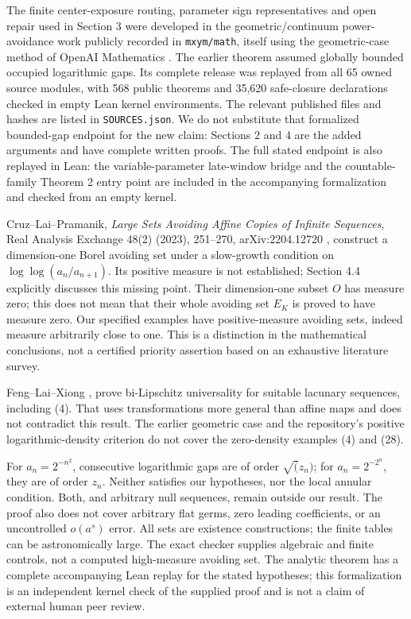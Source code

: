 \documentclass[
  11pt,
]{article}
\begin{document}
The finite center-exposure routing, parameter sign representatives and
open repair used in Section 3 were developed in the geometric/continuum
power-avoidance work publicly recorded in \texttt{mxym/math}, itself
using the geometric-case method of OpenAI Mathematics \cite{GEO}. The earlier
theorem \cite{ZCONT} assumed globally bounded occupied logarithmic gaps. Its complete
release was replayed from all 65 owned source modules, with 568 public
theorems and 35,620 safe-closure declarations checked in empty Lean
kernel environments. The relevant published files and hashes are listed
in \texttt{SOURCES.json}. We do not substitute that formalized
bounded-gap endpoint for the new claim: Sections 2 and 4 are the added
arguments and have complete written proofs. The full stated endpoint is
also replayed in Lean: the variable-parameter late-window bridge and the
countable-family Theorem 2 entry point are included in the accompanying
formalization and checked from an empty kernel.

Cruz--Lai--Pramanik, \emph{Large Sets Avoiding Affine Copies of Infinite
Sequences}, Real Analysis Exchange 48(2) (2023), 251--270,
arXiv:2204.12720 \cite{CLP}, construct a dimension-one Borel avoiding set under a
slow-growth condition on \(\log\log (a_n/a_{n+1})\). Its positive
measure is not established; Section 4.4 explicitly discusses this
missing point. Their dimension-one subset \(O\) has measure zero; this
does not mean that their whole avoiding set \(E_K\) is proved to have
measure zero. Our specified examples have positive-measure avoiding
sets, indeed measure arbitrarily close to one. This is a distinction in
the mathematical conclusions, not a certified priority assertion based
on an exhaustive literature survey.

Feng--Lai--Xiong \cite{FLX}, prove bi-Lipschitz universality for
suitable lacunary sequences, including (4). That uses transformations
more general than affine maps and does not contradict this result. The
earlier geometric case and the repository's positive logarithmic-density
criterion do not cover the zero-density examples (4) and (28).

For \(a_n=2^{-n^2}\), consecutive logarithmic gaps are of order
\(\sqrt(z_n)\); for \(a_n=2^{-2^n}\), they are of order \(z_n\). Neither
satisfies our hypotheses, nor the local annular condition. Both, and
arbitrary null sequences, remain outside our result. The proof also does
not cover arbitrary flat germs, zero leading coefficients, or an
uncontrolled \(o(a^s)\) error. All sets are existence constructions; the
finite tables can be astronomically large. The exact checker supplies
algebraic and finite controls, not a computed high-measure avoiding set.
The analytic theorem has a complete accompanying Lean replay for the
stated hypotheses; this formalization is an independent kernel check of
the supplied proof and is not a claim of external human peer review.
\end{document}

